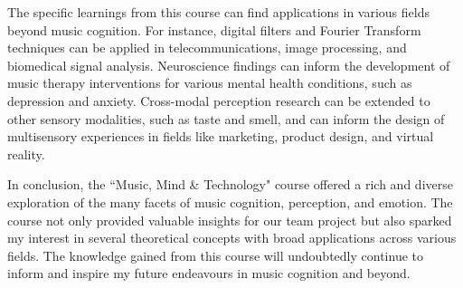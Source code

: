 \documentclass[conference]{IEEEtran}
\begin{document}
The specific learnings from this course can find applications in various fields beyond music cognition. For instance, digital filters and Fourier Transform techniques can be applied in telecommunications, image processing, and biomedical signal analysis. Neuroscience findings can inform the development of music therapy interventions for various mental health conditions, such as depression and anxiety. Cross-modal perception research can be extended to other sensory modalities, such as taste and smell, and can inform the design of multisensory experiences in fields like marketing, product design, and virtual reality.

In conclusion, the ``Music, Mind \& Technology" course offered a rich and diverse exploration of the many facets of music cognition, perception, and emotion. The course not only provided valuable insights for our team project but also sparked my interest in several theoretical concepts with broad applications across various fields. The knowledge gained from this course will undoubtedly continue to inform and inspire my future endeavours in music cognition and beyond.
\end{document}
